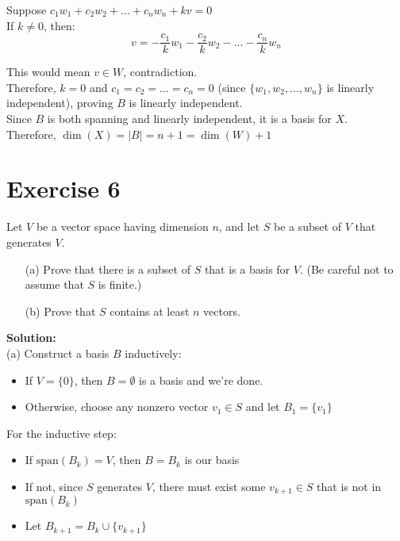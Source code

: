 \documentclass{article}
\begin{document}
Suppose $c_1w_1 + c_2w_2 + ... + c_nw_n + kv = 0$ \\

If $k \neq 0$, then:
\[v = -\frac{c_1}{k}w_1 - \frac{c_2}{k}w_2 - ... - \frac{c_n}{k}w_n\]

This would mean $v \in W$, contradiction. \\

Therefore, $k = 0$ and $c_1 = c_2 = ... = c_n = 0$ (since $\{w_1, w_2, ..., w_n\}$ is linearly independent), proving $B$ is linearly independent. \\

Since $B$ is both spanning and linearly independent, it is a basis for $X$. \\

Therefore, $\dim(X) = |B| = n + 1 = \dim(W) + 1$

\newpage

\section*{Exercise 6}
Let $V$ be a vector space having dimension $n$, and let $S$ be a subset of $V$ that generates $V$.
\begin{itemize}
\item[(a)] Prove that there is a subset of $S$ that is a basis for $V$. (Be careful not to assume that $S$ is finite.)
\item[(b)] Prove that $S$ contains at least $n$ vectors.
\end{itemize}

\textbf{Solution:} \\

(a) Construct a basis $B$ inductively:
   \begin{itemize}
   \item If $V = \{0\}$, then $B = \emptyset$ is a basis and we're done.
   \item Otherwise, choose any nonzero vector $v_1 \in S$ and let $B_1 = \{v_1\}$
   \end{itemize}

For the inductive step:
   \begin{itemize}
   \item If $\text{span}(B_k) = V$, then $B = B_k$ is our basis
   \item If not, since $S$ generates $V$, there must exist some $v_{k+1} \in S$ that is not in $\text{span}(B_k)$
   \item Let $B_{k+1} = B_k \cup \{v_{k+1}\}$
   \end{itemize}
\end{document}
